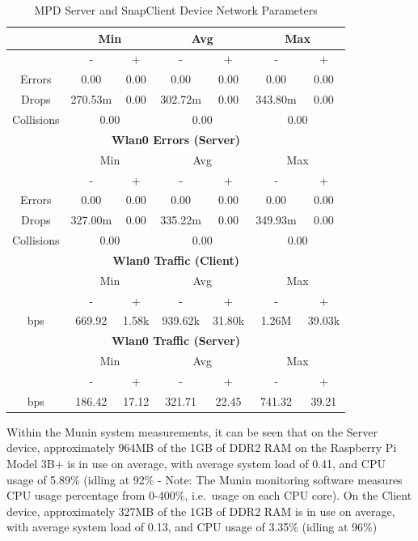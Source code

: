 \documentclass[11pt,a4paper]{scrreprt}
\begin{document}
\begin{table}[H]
\begin{tabular}{||c|c|c|c|c|c|c||}
    \hline\hline
      & \multicolumn{2}{|c|}{Min} & \multicolumn{2}{|c|}{Avg} & \multicolumn{2}{|c|}{Max} \\
    \hline
      & - & + & - & + & - & + \\
    \hline
    Errors  & 0.00 & 0.00 & 0.00 & 0.00 & 0.00 & 0.00 \\
    \hline
    Drops & 270.53m & 0.00 & 302.72m & 0.00 & 343.80m & 0.00 \\
    \hline
    Collisions & \multicolumn{2}{|c|}{0.00} & \multicolumn{2}{|c|}{0.00} & \multicolumn{2}{|c|}{0.00} \\
    \hline\hline
    \multicolumn{7}{|c|}{\textbf{Wlan0 Errors (Server)}} \\
    \hline\hline
      & \multicolumn{2}{|c|}{Min} & \multicolumn{2}{|c|}{Avg} & \multicolumn{2}{|c|}{Max} \\
    \hline
      & - & + & - & + & - & + \\
    \hline
    Errors  & 0.00 & 0.00 & 0.00 & 0.00 & 0.00 & 0.00 \\
    \hline
    Drops & 327.00m & 0.00 & 335.22m & 0.00 & 349.93m & 0.00 \\
    \hline
    Collisions & \multicolumn{2}{|c|}{0.00} & \multicolumn{2}{|c|}{0.00} & \multicolumn{2}{|c|}{0.00} \\
    \hline\hline
    \multicolumn{7}{|c|}{\textbf{Wlan0 Traffic (Client)}} \\
    \hline\hline
      & \multicolumn{2}{|c|}{Min} & \multicolumn{2}{|c|}{Avg} & \multicolumn{2}{|c|}{Max} \\
    \hline
      & - & + & - & + & - & + \\
    \hline
    bps  & 669.92 & 1.58k & 939.62k & 31.80k & 1.26M & 39.03k \\
    \hline\hline
    \multicolumn{7}{|c|}{\textbf{Wlan0 Traffic (Server)}} \\
    \hline\hline
      & \multicolumn{2}{|c|}{Min} & \multicolumn{2}{|c|}{Avg} & \multicolumn{2}{|c|}{Max} \\
    \hline
      & - & + & - & + & - & + \\
    \hline
    bps  & 186.42 & 17.12 & 321.71 & 22.45 & 741.32 & 39.21 \\
    \hline\hline
    \end{tabular}
    \caption{MPD Server and SnapClient Device Network Parameters}
    \label{MPDclientserverNetTab}
\end{table}

Within the Munin system measurements, it can be seen that on the Server
device, approximately 964MB of the 1GB of DDR2 RAM on the Raspberry Pi
Model 3B+ is in use on average, with average system load of 0.41, and
CPU usage of 5.89\% (idling at 92\% - Note: The Munin monitoring
software measures CPU usage percentage from 0-400\%, i.e.~usage on each
CPU core). On the Client device, approximately 327MB of the 1GB of DDR2
RAM is in use on average, with average system load of 0.13, and CPU
usage of 3.35\% (idling at 96\%)
\end{document}
